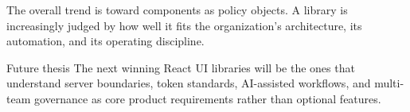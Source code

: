 The overall trend is toward components as policy objects. A library is increasingly judged by how well it fits the organization’s architecture, its automation, and its operating discipline.

\begin{highlightbox}{Future thesis}
The next winning React UI libraries will be the ones that understand server boundaries, token standards, AI-assisted workflows, and multi-team governance as core product requirements rather than optional features.
\end{highlightbox}
